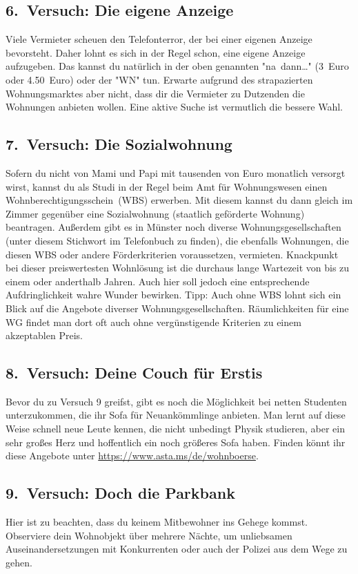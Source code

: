 \begin{multicols*}{2}
\subsection{6.~Versuch: Die eigene Anzeige}
Viele Vermieter scheuen den Telefonterror, der bei einer eigenen Anzeige bevorsteht.
Daher lohnt es sich in der Regel schon, eine eigene Anzeige aufzugeben.
Das kannst du natürlich in der oben genannten "na~dann\dots" (3~Euro oder \num{4,50}~Euro) oder der "WN" tun.
Erwarte aufgrund des strapazierten Wohnungsmarktes aber nicht, dass dir die Vermieter zu Dutzenden die Wohnungen anbieten wollen.
Eine aktive Suche ist vermutlich die bessere Wahl.

\subsection{7.~Versuch: Die Sozialwohnung}
Sofern du nicht von Mami und Papi mit tausenden von Euro monatlich versorgt wirst, kannst du als Studi in der Regel beim Amt für Wohnungswesen einen Wohnberechtigungsschein~(WBS) erwerben.
Mit diesem kannst du dann gleich im Zimmer gegenüber eine Sozialwohnung (staatlich geförderte Wohnung) beantragen.
Außerdem gibt es in Münster noch diverse Wohnungsgesellschaften (unter diesem Stichwort im Telefonbuch zu finden), die ebenfalls Wohnungen, die diesen WBS oder andere Förderkriterien voraussetzen, vermieten.
Knackpunkt bei dieser preiswertesten Wohnlösung ist die durchaus lange Wartezeit von bis zu einem oder anderthalb Jahren.
Auch hier soll jedoch eine entsprechende Aufdringlichkeit wahre Wunder bewirken.
Tipp: Auch ohne WBS lohnt sich ein Blick auf die Angebote diverser Wohnungsgesellschaften.
Räumlichkeiten für eine WG findet man dort oft auch ohne vergünstigende Kriterien zu einem akzeptablen Preis.

\subsection{8.~Versuch: Deine Couch für Erstis}
Bevor du zu Versuch 9 greifst, gibt es noch die Möglichkeit bei netten Studenten unterzukommen, die ihr Sofa für Neuankömmlinge anbieten. Man lernt auf diese Weise schnell neue Leute kennen, die nicht unbedingt Physik studieren, aber ein sehr großes Herz und hoffentlich ein noch größeres Sofa haben. Finden könnt ihr diese Angebote unter \url{https://www.asta.ms/de/wohnboerse}.

\subsection{9.~Versuch: Doch die Parkbank}
Hier ist zu beachten, dass du keinem Mitbewohner ins Gehege kommst.
Observiere dein Wohnobjekt über mehrere Nächte, um unliebsamen Auseinandersetzungen mit Konkurrenten oder auch der Polizei aus dem Wege zu gehen.


\end{multicols*}
